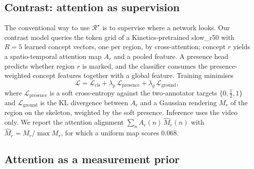 \subsection{Contrast: attention as supervision}
\label{sec:sup}

The conventional way to use $\mathcal{R}^{\star}$ is to supervise where a network looks. Our
contrast model queries the token grid of a Kinetics-pretrained slow\_r50 with $R{=}5$ learned
concept vectors, one per region, by cross-attention; concept $r$ yields a spatio-temporal
attention map $A_r$ and a pooled feature. A presence head predicts whether region $r$ is
marked, and the classifier consumes the presence-weighted concept features together with a
global feature. Training minimises
\begin{equation}
\mathcal{L}=\mathcal{L}_{\mathrm{cls}}+\lambda_p\,\mathcal{L}_{\mathrm{presence}}
+\lambda_g\,\mathcal{L}_{\mathrm{ground}},
\label{eq:sup}
\end{equation}
where $\mathcal{L}_{\mathrm{presence}}$ is a soft cross-entropy against the two-annotator
targets $\{0,\tfrac12,1\}$ and $\mathcal{L}_{\mathrm{ground}}$ is the KL divergence between
$A_r$ and a Gaussian rendering $M_r$ of the region on the skeleton, weighted by the soft
presence. Inference uses the video only. We report the attention alignment
$\sum_n A_r(n)\,\hat M_r(n)$ with $\hat M_r=M_r/\max M_r$, for which a uniform map scores
$0.068$.

\subsection{Attention as a measurement prior}
\label{sec:prior}

